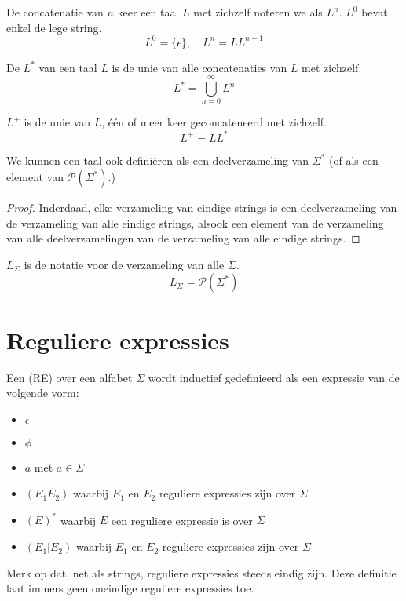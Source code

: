 \documentclass[main.tex]{subfiles}
\begin{document}
\begin{de}
  De concatenatie van $n$ keer een taal $L$ met zichzelf noteren we als $L^n$.
  $L^0$ bevat enkel de lege string.
  \[
  L^0 = \{\epsilon\},\quad L^{n} = LL^{n-1}
  \]
\end{de}

\begin{de}
  De  $L^*$ van een taal $L$ is de unie van alle concatenaties van $L$ met zichzelf.
  \[
  L^* = \bigcup_{n=0}^{\infty}L^n
  \]
\end{de}

\begin{de}
  $L^{+}$ is de unie van $L$, \'e\'en of meer keer geconcateneerd met zichzelf.
  \[
  L^{+} = LL^{*}
  \]
\end{de}

\begin{ei}
  \label{ei:taal-alternatieve-definitie}
  We kunnen een taal ook defini\"eren als een deelverzameling van $\Sigma^{*}$ (of als een element van $\mathcal{P}(\Sigma^{*})$.)

  \begin{proof}
    Inderdaad, elke verzameling van eindige strings is een deelverzameling van de verzameling van alle eindige strings, alsook een element van de verzameling van alle deelverzamelingen van de verzameling van alle eindige strings.
  \end{proof}
\end{ei}

\begin{de}
  $L_{\Sigma}$ is de notatie voor de verzameling van alle  $\Sigma$. 
  \[ L_{\Sigma} = \mathcal{P}(\Sigma^{*}) \]
\end{de}

\section{Reguliere expressies}
\label{sec:reguliere-expressies}

\begin{de}
  Een  (RE) over een alfabet $\Sigma$ wordt inductief gedefinieerd als een expressie van de volgende vorm:
  \begin{itemize}
  \item $\epsilon$
  \item $\phi$
  \item $a$ met $a \in \Sigma$
  \item $(E_1E_2)$ waarbij $E_1$ en $E_2$ reguliere expressies zijn over $\Sigma$
  \item $(E)^*$ waarbij $E$ een reguliere expressie is over $\Sigma$
  \item $(E_1|E_2)$ waarbij $E_1$ en $E_2$ reguliere expressies zijn over $\Sigma$
  \end{itemize}
  Merk op dat, net als strings, reguliere expressies steeds eindig zijn.
  Deze definitie laat immers geen oneindige reguliere expressies toe.
\end{de}
\end{document}
